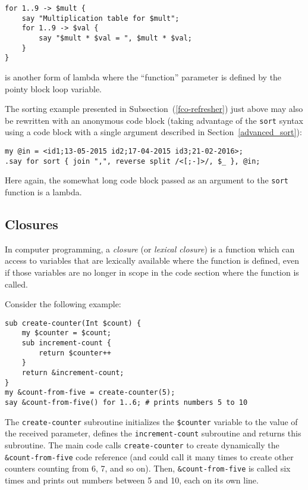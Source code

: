 \begin{verbatim}
for 1..9 -> $mult {
    say "Multiplication table for $mult";
    for 1..9 -> $val {
        say "$mult * $val = ", $mult * $val;
    }
}
\end{verbatim}

is another form of lambda where the ``function'' parameter is 
defined by the pointy block loop variable.

The sorting example presented in Subsection~(\ref{fco-refresher}) 
just above may also be rewritten with an 
anonymous code block (taking advantage of the {\tt sort} 
syntax using a code block with a single argument described 
in Section~\ref{advanced_sort}):
\begin{verbatim}
my @in = <id1;13-05-2015 id2;17-04-2015 id3;21-02-2016>;
.say for sort { join ",", reverse split /<[;-]>/, $_ }, @in;
\end{verbatim}

Here again, the somewhat long code block passed as an 
argument to the {\tt sort} function is a lambda.

\subsection{Closures}

In computer programming, a \emph{closure} (or \emph{lexical 
closure}) is a function which can access to variables that 
are lexically available where the function is defined, even 
if those variables are no longer in scope in the code section 
where the function is called.

Consider the following example:

\begin{verbatim}
sub create-counter(Int $count) {
    my $counter = $count;
    sub increment-count {
        return $counter++
    }
    return &increment-count;
}
my &count-from-five = create-counter(5);
say &count-from-five() for 1..6; # prints numbers 5 to 10
\end{verbatim}

The {\tt create-counter} subroutine initializes the 
\verb'$counter' variable to the value of the received 
parameter, defines the {\tt increment-count} subroutine 
and returns this subroutine. The main code calls 
{\tt create-counter} to create dynamically the 
\verb'&count-from-five' code reference (and could 
call it many times to create other counters counting 
from 6, 7, and so on).  Then, \verb'&count-from-five' 
is called six times and prints out numbers between 5 
and 10, each on its own line.

